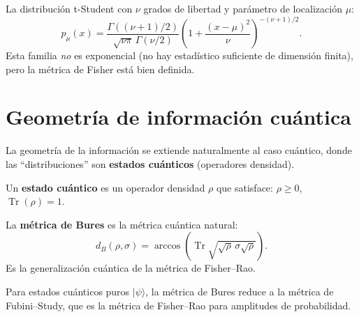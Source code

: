 \begin{example}
	La distribución t-Student con $\nu$ grados de libertad y parámetro de localización $\mu$:
	\[
	p_\mu(x) = \frac{\Gamma((\nu+1)/2)}{\sqrt{\nu\pi}\,\Gamma(\nu/2)} \left(1 + \frac{(x-\mu)^2}{\nu}\right)^{-(\nu+1)/2}.
	\]
	Esta familia \emph{no} es exponencial (no hay estadístico suficiente de dimensión finita), pero la métrica de Fisher está bien definida.
\end{example}

\begin{center}
\end{center}

\section{Geometría de información cuántica}

La geometría de la información se extiende naturalmente al caso cuántico, donde las ``distribuciones'' son \textbf{estados cuánticos} (operadores densidad).

\begin{definition}
	Un \textbf{estado cuántico} es un operador densidad $\rho$ que satisface: $\rho \ge 0$, $\operatorname{Tr}(\rho) = 1$.
\end{definition}

\begin{definition}
	La \textbf{métrica de Bures} es la métrica cuántica natural:
	\[
	d_B(\rho, \sigma) = \arccos\left(\operatorname{Tr}\sqrt{\sqrt{\rho}\,\sigma\sqrt{\rho}}\right).
	\]
	Es la generalización cuántica de la métrica de Fisher--Rao.
\end{definition}

\begin{theorem}
	Para estados cuánticos puros $|\psi\rangle$, la métrica de Bures reduce a la métrica de Fubini--Study, que es la métrica de Fisher--Rao para amplitudes de probabilidad.
\end{theorem}

